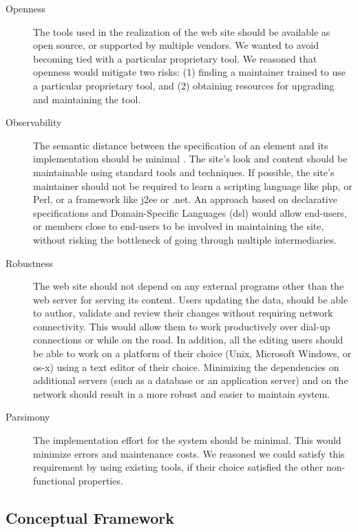 \documentclass{elsart}
\begin{document}
\begin{description}
\item[Openness] The tools used in the realization of the web site
should be available as open source, or supported by multiple vendors.
We wanted to avoid becoming tied with a particular proprietary
tool.
We reasoned that openness would mitigate two risks:
(1) finding a maintainer trained to use a particular proprietary tool,
and (2) obtaining resources for upgrading and maintaining the tool.

\item[Observability]
The semantic distance between
the specification of an element and its implementation 
should be minimal \cite{SG97}.
The site's look and content should be maintainable
using standard tools and techniques.
If possible, the site's maintainer should not be required to
learn a scripting language like {\sc php}, or Perl, or
a framework like {\sc j2ee} or {\sc .net}.
An approach based on declarative specifications \cite{FFLS00} and
Domain-Specific Languages ({\sc dsl}) \cite{DKV00,Spi00b} would allow end-users, or members
close to end-users to be involved in maintaining the site,
without risking the bottleneck of going through
multiple intermediaries.

\item[Robustness] The web site should not depend on
any external programs other than the web server for serving
its content.
Users updating the data, should be able to author, validate and 
review their changes without requiring network connectivity.
This would allow them to work productively over dial-up connections
or while on the road. In addition, all the editing users should be able 
to work on a platform of their choice (Unix, Microsoft Windows, or {\sc os-x}) 
using a text editor of their choice.
Minimizing the dependencies on additional servers (such as a
database or an application server) and on the network
should result in a more robust and easier to maintain system.

\item[Parsimony] The implementation effort for
the system should be minimal.
This would minimize errors and maintenance costs.
We reasoned we could satisfy this requirement by
using existing tools, if their choice satisfied the
other non-functional properties.
\end{description} 

\subsection{Conceptual Framework}
\end{document}
